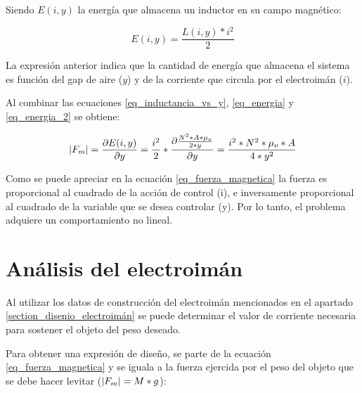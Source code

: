 \noindent Siendo $E(i,y)$ la energía que almacena un inductor en su campo magnético:

\begin{equation}\label{eq_energia_2}
	E(i,y)=\frac{L(i,y)*i^{2}}{2}
\end{equation}

\noindent La expresión anterior indica que la cantidad de energía que almacena el sistema es función del gap de aire ($y$) y de la corriente que circula por el electroimán ($i$). 

\noindent Al combinar las ecuaciones \ref{eq_inductancia_vs_y}, \ref{eq_energia} y \ref{eq_energia_2} se obtiene:

\begin{equation}\label{eq_fuerza_magnetica}
	\lvert F_{m}\rvert=\frac{\partial{E(i,y)}}{\partial{y}}=\frac{i^{2}}{2}*\frac{\partial{\frac{{N^{2}*A*\mu_{o}}}{2*y}}}{\partial{y}}=\frac{i^{2}*N^{2}*\mu_{o}*A}{4*y^{2}}
\end{equation}

\noindent Como se puede apreciar en la ecuación \ref{eq_fuerza_magnetica} la fuerza es proporcional al cuadrado de la acción de control (i), e inversamente proporcional al cuadrado de la variable que se desea controlar (y). Por lo tanto, el problema adquiere un comportamiento no lineal.


\section{Análisis del electroimán}

\noindent Al utilizar los datos de construcción del electroimán mencionados en el apartado \ref{section_disenio_electroimán} se puede determinar el valor de corriente necesaria para sostener el objeto del peso deseado.
	


\noindent Para obtener una expresión de diseño, se parte de la ecuación \ref{eq_fuerza_magnetica} y se iguala a la fuerza ejercida por el peso del objeto que se debe hacer levitar ($\lvert F_{m}\rvert=M*g$):

